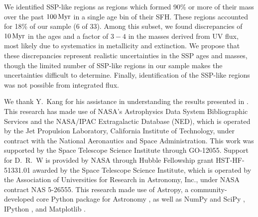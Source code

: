 We identified SSP-like regions as regions which formed 90\% or more of their
mass over the past $100\,\mathrm{Myr}$ in a single age bin of their SFH. These
regions accounted for 18\% of our sample (6 of 33). Among this subset, we found
discrepancies of $10\,\mathrm{Myr}$ in the ages and a factor of $3-4$ in the
masses derived from UV flux, most likely due to systematics in metallicity and
extinction. We propose that these discrepancies represent realistic
uncertainties in the SSP ages and masses, though the limited number of SSP-like
regions in our sample makes the uncertainties difficult to determine. Finally,
identification of the SSP-like regions was not possible from integrated \fuv{}
flux.

We thank Y.~Kang for his assistance in understanding the results presented in
\citet{Kang:2009}. This research has made use of NASA's Astrophysics Data System
Bibliographic Services and the NASA/IPAC Extragalactic Database (NED), which is
operated by the Jet Propulsion Laboratory, California Institute of Technology,
under contract with the National Aeronautics and Space Administration. This
work was supported by the Space Telescope Science Institute through GO-12055.
Support for D.~R.~W is provided by NASA through Hubble Fellowship grant
HST-HF-51331.01 awarded by the Space Telescope Science Institute, which is
operated by the Association of Universities for Research in Astronomy, Inc.,
under NASA contract NAS 5-26555. This research made use of Astropy, a
community-developed core Python package for Astronomy \citep{Astropy_Collaboration:2013}, as well
as NumPy and SciPy \citep{Oliphant:2007}, IPython \citep{Perez:2007}, and Matplotlib
\citep{Hunter:2007}.
